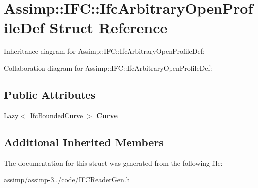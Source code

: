 \hypertarget{struct_assimp_1_1_i_f_c_1_1_ifc_arbitrary_open_profile_def}{\section{Assimp\+:\+:I\+F\+C\+:\+:Ifc\+Arbitrary\+Open\+Profile\+Def Struct Reference}
\label{struct_assimp_1_1_i_f_c_1_1_ifc_arbitrary_open_profile_def}
}


Inheritance diagram for Assimp\+:\+:I\+F\+C\+:\+:Ifc\+Arbitrary\+Open\+Profile\+Def\+:


Collaboration diagram for Assimp\+:\+:I\+F\+C\+:\+:Ifc\+Arbitrary\+Open\+Profile\+Def\+:
\subsection*{Public Attributes}
\begin{DoxyCompactItemize}
\item 
\hypertarget{struct_assimp_1_1_i_f_c_1_1_ifc_arbitrary_open_profile_def_af2f28d203950e1bb3807a22a99707c80}{\hyperlink{struct_assimp_1_1_s_t_e_p_1_1_lazy}{Lazy}$<$ \hyperlink{struct_assimp_1_1_i_f_c_1_1_ifc_bounded_curve}{Ifc\+Bounded\+Curve} $>$ {\bfseries Curve}}\label{struct_assimp_1_1_i_f_c_1_1_ifc_arbitrary_open_profile_def_af2f28d203950e1bb3807a22a99707c80}

\end{DoxyCompactItemize}
\subsection*{Additional Inherited Members}


The documentation for this struct was generated from the following file\+:\begin{DoxyCompactItemize}
\item 
assimp/assimp-\/3../code/I\+F\+C\+Reader\+Gen.\+h\end{DoxyCompactItemize}
